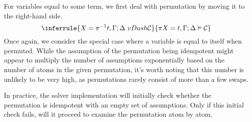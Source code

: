 \documentclass[english, mgr]{iithesis}
\begin{document}
For variables equal to some term,
we first deal with permutation by moving it to the right-hand side.
$$
\inferrule{
   \termv = \pi^{-1} \term, \cEnv ; \icEnv \ vDash \sconstr
}{
   \pi \termv = \term, \cEnv ; \icEnv \vDash \sconstr
}
$$
Once again, we consider the special case where a variable is equal to itself when permuted.
While the assumption of the permutation being idempotent might appear to multiply the number of assumptions exponentially based on the number of atoms in the given permutation,
it's worth noting that this number is unlikely to be very high, as permutations rarely consist of more than a few swaps.

In practice, the solver implementation will initially check whether the permutation is idempotent with an empty set of assumptions.
Only if this initial check fails, will it proceed to examine the permutation atom by atom.
\end{document}
